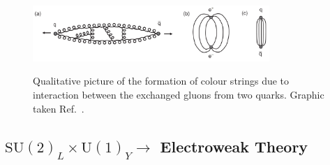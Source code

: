 \begin{figure}[h]
    \centering
    \includegraphics[width=0.8\textwidth]{Figures/standard_model/confinement.png}
    \begin{subfigure}{0pt}\label{fig:confinement_a}\end{subfigure}
    \begin{subfigure}{0pt}\label{fig:confinement_b}\end{subfigure}
    \begin{subfigure}{0pt}\label{fig:confinement_c}\end{subfigure}
    \caption{Qualitative picture of the formation of colour strings due to interaction between the exchanged gluons from two quarks. Graphic taken Ref.~\cite{ModernParticlePhysics}.}
    \label{fig:confinement}
\end{figure}

\subsection{\texorpdfstring{$\text{SU}(2)_L \times \text{U}(1)_Y \rightarrow$}{SU(2)xSU(1)-} Electroweak Theory}
\label{sec:electroweak}

